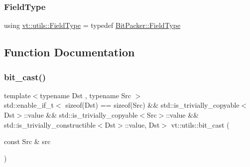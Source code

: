 \subsubsection{\texorpdfstring{Field\+Type}{FieldType}}
{\footnotesize\ttfamily using \hyperlink{namespacevt_1_1utils_a83bf4339dd1250f9880b6d4603320d39}{vt\+::utils\+::\+Field\+Type} = typedef \hyperlink{structvt_1_1utils_1_1_bit_packer_a23024285425933c1f10c8fc3942f9beb}{Bit\+Packer\+::\+Field\+Type}}



\subsection{Function Documentation}
\mbox{\label{namespacevt_1_1utils_a5aec27f45ff5fd0bacb4b589a100e5be}} 
\subsubsection{\texorpdfstring{bit\+\_\+cast()}{bit\_cast()}}
{\footnotesize\ttfamily template$<$typename Dst , typename Src $>$ \\
std\+::enable\+\_\+if\+\_\+t$<$ sizeof(Dst) == sizeof(Src) \&\& std\+::is\+\_\+trivially\+\_\+copyable$<$Dst$>$\+::value \&\& std\+::is\+\_\+trivially\+\_\+copyable$<$Src$>$\+::value \&\& std\+::is\+\_\+trivially\+\_\+constructible$<$Dst$>$\+::value, Dst$>$ vt\+::utils\+::bit\+\_\+cast (\begin{DoxyParamCaption}\item[{const Src \&}]{src }\end{DoxyParamCaption})}

